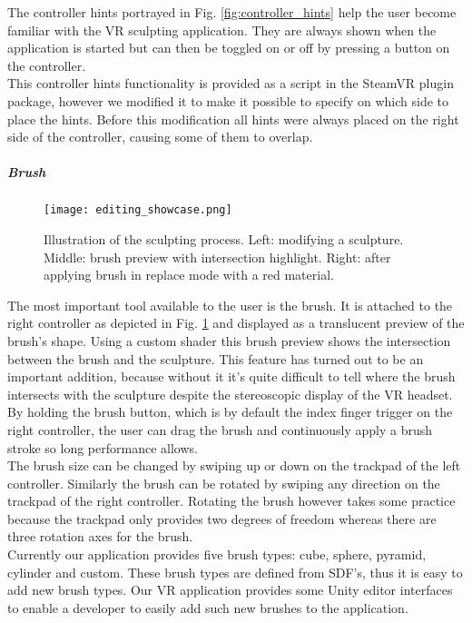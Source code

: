 The controller hints portrayed in Fig. \ref{fig:controller_hints} help the user become familiar with the VR sculpting application. They are always shown when the application is started but can then be toggled on or off by pressing a button on the controller.\\
This controller hints functionality is provided as a script in the SteamVR plugin package, however we modified it to make it possible to specify on which side to place the hints. Before this modification all hints were always placed on the right side of the controller, causing some of them to overlap.

\subparagraph{Brush}

\begin{figure}
\centering
\captionsetup{width=0.8\textwidth}
\texttt{[image: editing\_showcase.png]}
\caption{Illustration of the sculpting process. Left: modifying a sculpture. Middle: brush preview with intersection highlight. Right: after applying brush in replace mode with a red material.}
\label{fig:editing_showcase}
\end{figure}

The most important tool available to the user is the brush. It is attached to the right controller as depicted in Fig. \ref{fig:editing_showcase} and displayed as a translucent preview of the brush's shape. Using a custom shader this brush preview shows the intersection between the brush and the sculpture. This feature has turned out to be an important addition, because without it it's quite difficult to tell where the brush intersects with the sculpture despite the stereoscopic display of the VR headset.\\
By holding the brush button, which is by default the index finger trigger on the right controller, the user can drag the brush and continuously apply a brush stroke so long performance allows.\\
The brush size can be changed by swiping up or down on the trackpad of the left controller. Similarly the brush can be rotated by swiping any direction on the trackpad of the right controller. Rotating the brush however takes some practice because the trackpad only provides two degrees of freedom whereas there are three rotation axes for the brush.\\
Currently our application provides five brush types: cube, sphere, pyramid, cylinder and custom. These brush types are defined from SDF's, thus it is easy to add new brush types. Our VR application provides some Unity editor interfaces to enable a developer to easily add such new brushes to the application.

